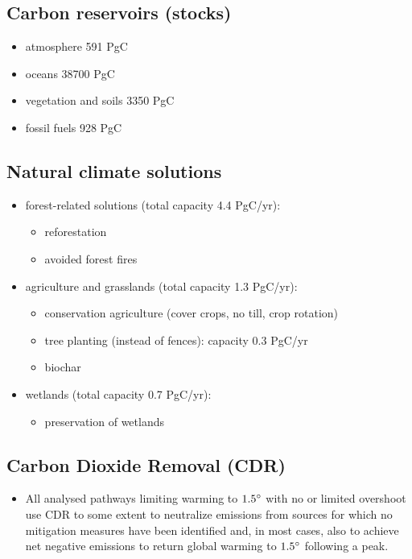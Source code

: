 \subsection{Carbon reservoirs (stocks)}

\begin{itemize}
	\item atmosphere 591 PgC
	\item oceans 38700 PgC
	\item vegetation and soils 3350 PgC
	\item fossil fuels 928 PgC
\end{itemize}

\subsection{Natural climate solutions}
\begin{itemize}
	\item forest-related solutions (total capacity 4.4 PgC/yr):
	\begin{itemize}
		\item reforestation
		\item avoided forest fires
	\end{itemize}
	\item agriculture and grasslands (total capacity 1.3 PgC/yr):
	\begin{itemize}
		\item conservation agriculture (cover crops, no till, crop
		rotation)
		\item tree planting (instead of fences): capacity 0.3 PgC/yr
		\item biochar
	\end{itemize}
	\item wetlands (total capacity 0.7 PgC/yr):
	\begin{itemize}
		\item preservation of wetlands
	\end{itemize}
\end{itemize}

\subsection{Carbon Dioxide Removal (CDR)}
\begin{itemize}
	\item All analysed pathways limiting warming to $1.5 \degree$ with
	no or limited overshoot use CDR to some extent to neutralize emissions
	from sources for which no mitigation measures have been identified and,
	in most cases, also to achieve net negative emissions to return
	global warming to $1.5 \degree$ following a peak.
\end{itemize}
